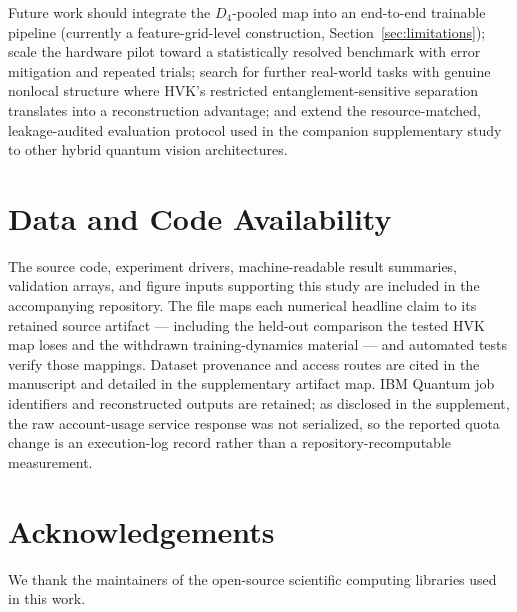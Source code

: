 \documentclass[journal]{IEEEtran}
\begin{document}
Future work should integrate the $D_4$-pooled map into an end-to-end trainable pipeline (currently a feature-grid-level construction, Section~\ref{sec:limitations}); scale the hardware pilot toward a statistically resolved benchmark with error mitigation and repeated trials; search for further real-world tasks with genuine nonlocal structure where HVK's restricted entanglement-sensitive separation translates into a reconstruction advantage; and extend the resource-matched, leakage-audited evaluation protocol used in the companion supplementary study to other hybrid quantum vision architectures.

\section*{Data and Code Availability}
The source code, experiment drivers, machine-readable result summaries, validation arrays, and figure inputs supporting this study are included in the accompanying repository. The file  maps each numerical headline claim to its retained source artifact --- including the held-out comparison the tested HVK map loses and the withdrawn training-dynamics material --- and automated tests verify those mappings. Dataset provenance and access routes are cited in the manuscript and detailed in the supplementary artifact map. IBM Quantum job identifiers and reconstructed outputs are retained; as disclosed in the supplement, the raw account-usage service response was not serialized, so the reported quota change is an execution-log record rather than a repository-recomputable measurement.

\section*{Acknowledgements}
We thank the maintainers of the open-source scientific computing libraries used in this work.
\end{document}
